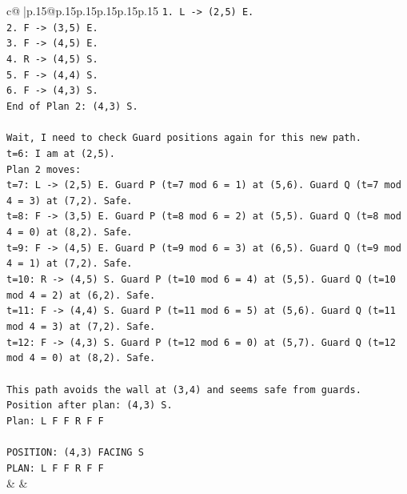 \documentclass{article}
\begin{document}
{\begin{supertabular}{c@{$\;$}|p{.15\linewidth}@{}p{.15\linewidth}p{.15\linewidth}p{.15\linewidth}p{.15\linewidth}p{.15\linewidth}}
{{{\texttt{1. L {-}> (2,5) E.} \\
\texttt{2. F {-}> (3,5) E.} \\
\texttt{3. F {-}> (4,5) E.} \\
\texttt{4. R {-}> (4,5) S.} \\
\texttt{5. F {-}> (4,4) S.} \\
\texttt{6. F {-}> (4,3) S.} \\
\texttt{End of Plan 2: (4,3) S.} \\
\\ 
\texttt{Wait, I need to check Guard positions again for this new path.} \\
\texttt{t=6: I am at (2,5).} \\
\texttt{Plan 2 moves:} \\
\texttt{t=7: L {-}> (2,5) E. Guard P (t=7 mod 6 = 1) at (5,6). Guard Q (t=7 mod 4 = 3) at (7,2). Safe.} \\
\texttt{t=8: F {-}> (3,5) E. Guard P (t=8 mod 6 = 2) at (5,5). Guard Q (t=8 mod 4 = 0) at (8,2). Safe.} \\
\texttt{t=9: F {-}> (4,5) E. Guard P (t=9 mod 6 = 3) at (6,5). Guard Q (t=9 mod 4 = 1) at (7,2). Safe.} \\
\texttt{t=10: R {-}> (4,5) S. Guard P (t=10 mod 6 = 4) at (5,5). Guard Q (t=10 mod 4 = 2) at (6,2). Safe.} \\
\texttt{t=11: F {-}> (4,4) S. Guard P (t=11 mod 6 = 5) at (5,6). Guard Q (t=11 mod 4 = 3) at (7,2). Safe.} \\
\texttt{t=12: F {-}> (4,3) S. Guard P (t=12 mod 6 = 0) at (5,7). Guard Q (t=12 mod 4 = 0) at (8,2). Safe.} \\
\\ 
\texttt{This path avoids the wall at (3,4) and seems safe from guards.} \\
\texttt{Position after plan: (4,3) S.} \\
\texttt{Plan: L F F R F F} \\
\\ 
\texttt{POSITION: (4,3) FACING S} \\
\texttt{PLAN: L F F R F F} \\
            }
        }
    }
    & & \\ \\


\end{supertabular}}
\end{document}
